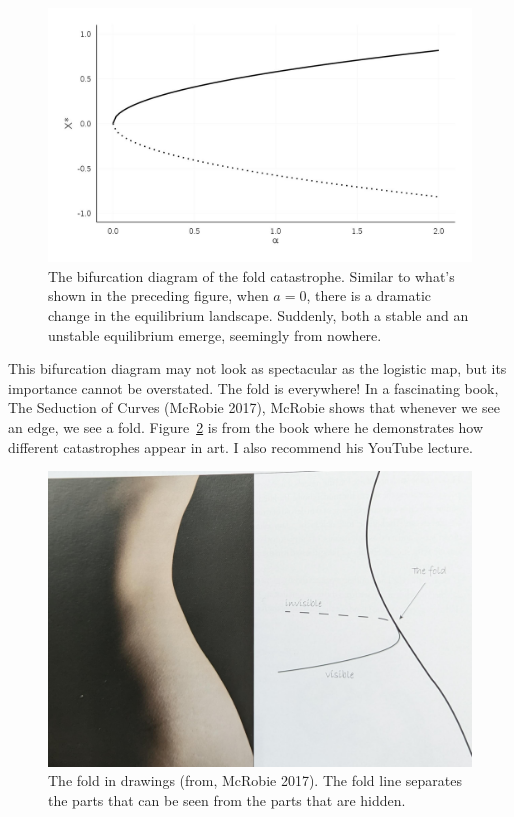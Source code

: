 \documentclass[
  a4paper,
  DIV=11,
  numbers=noendperiod,
  oneside]{scrreprt}
\begin{document}
\begin{figure}

{\centering \includegraphics{media/ch3/fig-ch3-img5-old-17.jpg}

}

\caption{\label{fig-ch3-img5-old-17}The bifurcation diagram of the fold
catastrophe. Similar to what's shown in the preceding figure, when
\(a=0\), there is a dramatic change in the equilibrium landscape.
Suddenly, both a stable and an unstable equilibrium emerge, seemingly
from nowhere.}

\end{figure}

This bifurcation diagram may not look as spectacular as the logistic
map, but its importance cannot be overstated. The fold is everywhere! In
a fascinating book, The Seduction of Curves (McRobie 2017), McRobie
shows that whenever we see an edge, we see a fold.
Figure~\ref{fig-ch3-img6-old-18} is from the book where he demonstrates
how different catastrophes appear in art. I also recommend his YouTube
lecture.

\begin{figure}

{\centering \includegraphics{media/ch3/image6.jpg}

}

\caption{\label{fig-ch3-img6-old-18}The fold in drawings (from, McRobie
2017). The fold line separates the parts that can be seen from the parts
that are hidden.}

\end{figure}
\end{document}
